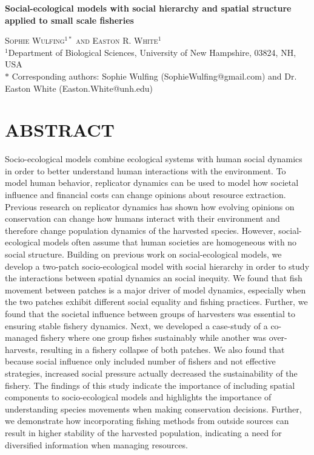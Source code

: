 \documentclass[
  12pt,
]{article}
\author{}
\date{\vspace{-2.5em}}
\begin{document}
\doublespacing

\begin{center}
    
\textbf{\Large Social-ecological models with social hierarchy and spatial structure applied to small scale fisheries}
    
\textsc{Sophie Wulfing$^{1*}$ and Easton R. White$^{1}$\\}
\vspace{3 mm}
\normalsize{\indent $^1$Department of Biological Sciences, University of New Hampshire, 03824, NH, USA\\}
$\text{*}$ Corresponding authors: Sophie Wulfing (SophieWulfing@gmail.com) and Dr. Easton White (Easton.White@unh.edu)
\end{center}

\newpage

\linenumbers

\hypertarget{abstract}{%
\section{ABSTRACT}\label{abstract}}

Socio-ecological models combine ecological systems with human social dynamics in order to better understand human interactions with the environment. To model human behavior, replicator dynamics can be used to model how societal influence and financial costs can change opinions about resource extraction. Previous research on replicator dynamics has shown how evolving opinions on conservation can change how humans interact with their environment and therefore change population dynamics of the harvested species. However, social-ecological models often assume that human societies are homogeneous with no social structure. Building on previous work on social-ecological models, we develop a two-patch socio-ecological model with social hierarchy in order to study the interactions between spatial dynamics an social inequity. We found that fish movement between patches is a major driver of model dynamics, especially when the two patches exhibit different social equality and fishing practices. Further, we found that the societal influence between groups of harvesters was essential to ensuring stable fishery dynamics. Next, we developed a case-study of a co-managed fishery where one group fishes sustainably while another was over-harvests, resulting in a fishery collapse of both patches. We also found that because social influence only included number of fishers and not effective strategies, increased social pressure actually decreased the sustainability of the fishery. The findings of this study indicate the importance of including spatial components to socio-ecological models and highlights the importance of understanding species movements when making conservation decisions. Further, we demonstrate how incorporating fishing methods from outside sources can result in higher stability of the harvested population, indicating a need for diversified information when managing resources.
\end{document}
